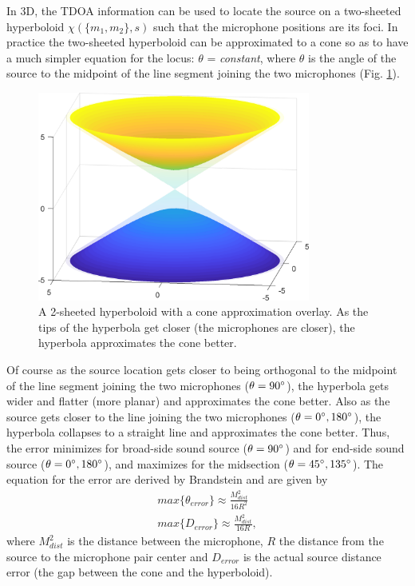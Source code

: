 In 3D, the TDOA information can be used to locate the source on a two-sheeted hyperboloid $\chi(\{m_{1},m_{2}\},s)$ such that the microphone positions are its foci. In practice the two-sheeted hyperboloid can be approximated to a cone so as to have a much simpler equation for the locus: $\theta$  = \textit{constant}, where $\theta$ is the angle of the source to the  midpoint of the line segment joining the two microphones (Fig. \ref{fig:hyperboloid_Cone}).
\begin{figure}[!ht]
    \centering
    \includegraphics[width=0.8\textwidth]{Figures/hyperboloid.png}
    \caption{A 2-sheeted hyperboloid with a cone approximation overlay. As the tips of the hyperbola get closer (the microphones are closer), the hyperbola approximates the cone better.}
    \label{fig:hyperboloid_Cone}
\end{figure}
Of course as the source location gets closer to being orthogonal to the midpoint of the line segment joining the two microphones ($\theta=90\degree$), the hyperbola gets wider and flatter (more planar) and approximates the cone better. Also as the source gets closer to the line joining the two microphones ($\theta=0\degree, 180\degree$), the hyperbola collapses to a straight line and approximates the cone better. Thus, the error minimizes for broad-side sound source ($\theta=90\degree$) and for end-side sound source ($\theta=0\degree, 180\degree$), and maximizes for the midsection ($\theta=45\degree, 135\degree$). The equation for the error are derived by Brandstein \cite{Brandstein:1995:FSS:922154} and are given by
\begin{equation}
\begin{split}
    max\{\theta_{error}\} \approx  \frac{M_{dist}^2}{16R^2}\\
    max\{D_{error}\} \approx  \frac{M_{dist}^2}{16R},
\end{split}
\end{equation}
where $M_{dist}^2$ is the distance between the microphone, $R$ the distance from the source to the microphone pair center and $D_{error}$ is the actual source distance error (the gap between the cone and the hyperboloid).

